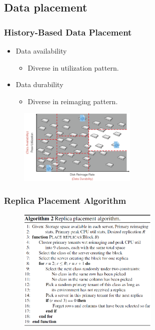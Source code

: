 \documentclass{beamer}
\begin{document}
\subsection{Data placement}
	\begin{frame}
	\frametitle{History-Based Data Placement}
		\begin{itemize}
		\item Data availability
			\begin{itemize}
			\item Diverse in utilization pattern.
			\end{itemize}
		\item Data durability
			\begin{itemize}
			\item Diverse in reimaging pattern.
			\end{itemize}
		\end{itemize}
		\begin{figure}[h!]
		\centering
		\includegraphics[width=0.5\textwidth]{./figure/data.PNG}
		\end{figure}
	\end{frame}

	\begin{frame}
	\frametitle{Replica Placement Algorithm}
		\begin{figure}[h!]
		\centering
		\includegraphics[width=0.6\textwidth]{./figure/algorithm2.PNG}
		\end{figure}
	\end{frame}
\end{document}
